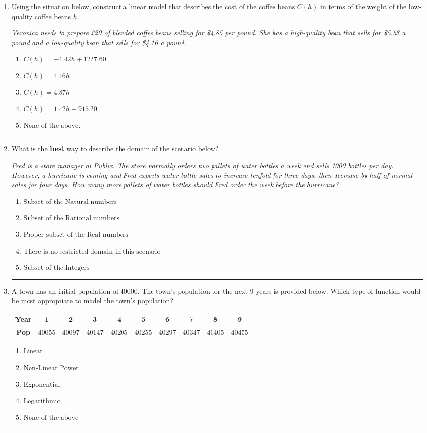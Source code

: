 \documentclass[14pt]{extbook}
\newcommand{\litem}[1]{\item#1\hspace*{-1cm}\rule{\textwidth}{0.4pt}}
\begin{document}
\begin{enumerate}
{\begin{enumerate}[label=\Alph*.]
\end{enumerate} }
\litem{
Using the situation below, construct a linear model that describes the cost of the coffee beans $C(h)$ in terms of the weight of the low-quality coffee beans $h$.
\begin{center}
    \textit{ Veronica needs to prepare 220 of blended coffee beans selling for \$4.85 per pound. She has a high-quality bean that sells for \$5.58 a pound and a low-quality bean that sells for \$4.16 a pound. }
\end{center}
\begin{enumerate}[label=\Alph*.]
\item \( C(h) = -1.42 h + 1227.60 \)
\item \( C(h) = 4.16 h \)
\item \( C(h) = 4.87 h \)
\item \( C(h) = 1.42 h + 915.20 \)
\item \( \text{None of the above.} \)

\end{enumerate} }
\litem{
What is the \textbf{best} way to describe the domain of the scenario below?
\begin{center}
    \textit{ Fred is a store manager at Publix. The store normally orders two pallets of water bottles a week and sells 1000 bottles per day. However, a hurricane is coming and Fred expects water bottle sales to increase tenfold for three days, then decrease by half of normal sales for four days. How many more pallets of water bottles should Fred order the week before the hurricane? }
\end{center}
\begin{enumerate}[label=\Alph*.]
\item \( \text{Subset of the Natural numbers} \)
\item \( \text{Subset of the Rational numbers} \)
\item \( \text{Proper subset of the Real numbers} \)
\item \( \text{There is no restricted domain in this scenario} \)
\item \( \text{Subset of the Integers} \)

\end{enumerate} }
\litem{
A town has an initial population of 40000. The town's population for the next 9 years is provided below. Which type of function would be most appropriate to model the town's population?

\begin{tabular}{c|c|c|c|c|c|c|c|c|c}
\textbf{Year} &1 &2 &3 &4 &5 &6 &7 &8 &9\tabularnewline \hline
\textbf{Pop} &40055 &40097 &40147 &40205 &40255 &40297 &40347 &40405 &40455\end{tabular}\begin{enumerate}[label=\Alph*.]
\item \( \text{Linear} \)
\item \( \text{Non-Linear Power} \)
\item \( \text{Exponential} \)
\item \( \text{Logarithmic} \)
\item \( \text{None of the above} \)


\end{enumerate}}
\end{enumerate}
\end{document}
